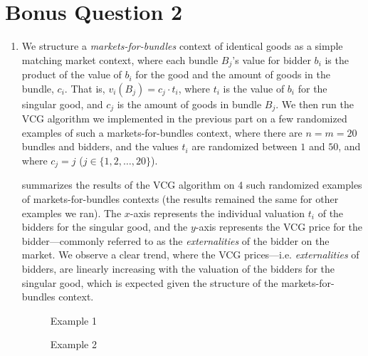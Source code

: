 \documentclass{article}
\begin{document}
\section{Bonus Question 2}

\begin{enumerate}[label=(\alph*)]

    \item We structure a \textit{markets-for-bundles} context of identical goods as a simple matching market context, where each bundle $B_j$'s value for bidder $b_i$ is the product of the value of $b_i$ for the good and the amount of goods in the bundle, $c_i$. That is, $v_{i}(B_j) = c_j \cdot t_i$, where $t_i$ is the value of $b_i$ for the singular good, and $c_j$ is the amount of goods in bundle $B_j$. We then run the VCG algorithm we implemented in the previous part on a few randomized examples of such a markets-for-bundles context, where there are $n = m = 20$ bundles and bidders, and the values $t_i$ are randomized between $1$ and $50$, and where $c_j = j$ ($j \in \{1, 2, \ldots, 20\}$).

     summarizes the results of the VCG algorithm on 4 such randomized examples of markets-for-bundles contexts (the results remained the same for other examples we ran). The $x$-axis represents the individual valuation $t_i$ of the bidders for the singular good, and the $y$-axis represents the VCG price for the bidder---commonly referred to as the \textit{externalities} of the bidder on the market. We observe a clear trend, where the VCG prices---i.e. \textit{externalities} of bidders, are linearly increasing with the valuation of the bidders for the singular good, which is expected given the structure of the markets-for-bundles context.

    \begin{figure*}[ht]
        \centering
        \begin{subfigure}{0.49\textwidth}
            \centering
            \resizebox{\textwidth}{!}{}
            \caption{Example 1}
        \end{subfigure}
        \hfill
        \begin{subfigure}{0.49\textwidth}
            \centering
            \resizebox{\textwidth}{!}{}
            \caption{Example 2}
        \end{subfigure}
        
        \vspace{1em} %
        

\end{figure*}
\end{enumerate}
\end{document}
